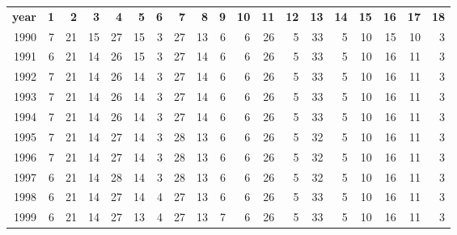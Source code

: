 \begin{tabular}{rrrrrrrrrrrrrrrrrrr}
  \hline
  \textbf{year} & \textbf{ 1} & \textbf{ 2} & \textbf{ 3} & \textbf{ 4} & \textbf{ 5} & \textbf{ 6} & \textbf{ 7} & \textbf{ 8} & \textbf{ 9} & \textbf{ 10} & \textbf{ 11} & \textbf{ 12} & \textbf{ 13} & \textbf{ 14} & \textbf{ 15} & \textbf{ 16} & \textbf{ 17} & \textbf{ 18} \\
  1990 & 7 & 21 & 15 & 27 & 15 & 3 & 27 & 13 & 6 & 6 & 26 & 5 & 33 & 5 & 10 & 15 & 10 & 3 \\
  1991 & 6 & 21 & 14 & 26 & 15 & 3 & 27 & 14 & 6 & 6 & 26 & 5 & 33 & 5 & 10 & 16 & 11 & 3 \\
  1992 & 7 & 21 & 14 & 26 & 14 & 3 & 27 & 14 & 6 & 6 & 26 & 5 & 33 & 5 & 10 & 16 & 11 & 3 \\
  1993 & 7 & 21 & 14 & 26 & 14 & 3 & 27 & 14 & 6 & 6 & 26 & 5 & 33 & 5 & 10 & 16 & 11 & 3 \\
  1994 & 7 & 21 & 14 & 26 & 14 & 3 & 27 & 14 & 6 & 6 & 26 & 5 & 33 & 5 & 10 & 16 & 11 & 3 \\
  1995 & 7 & 21 & 14 & 27 & 14 & 3 & 28 & 13 & 6 & 6 & 26 & 5 & 32 & 5 & 10 & 16 & 11 & 3 \\
  1996 & 7 & 21 & 14 & 27 & 14 & 3 & 28 & 13 & 6 & 6 & 26 & 5 & 32 & 5 & 10 & 16 & 11 & 3 \\
  1997 & 6 & 21 & 14 & 28 & 14 & 3 & 28 & 13 & 6 & 6 & 26 & 5 & 32 & 5 & 10 & 16 & 11 & 3 \\
  1998 & 6 & 21 & 14 & 27 & 14 & 4 & 27 & 13 & 6 & 6 & 26 & 5 & 33 & 5 & 10 & 16 & 11 & 3 \\
  1999 & 6 & 21 & 14 & 27 & 13 & 4 & 27 & 13 & 7 & 6 & 26 & 5 & 33 & 5 & 10 & 16 & 11 & 3 \\\hline
\end{tabular}

